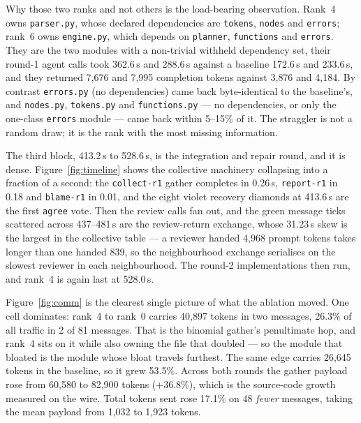 \documentclass[11pt]{article}
\begin{document}
Why those two ranks and not others is the load-bearing observation. Rank~4 owns
\texttt{parser.py}, whose declared dependencies are \texttt{tokens}, \texttt{nodes} and
\texttt{errors}; rank~6 owns \texttt{engine.py}, which depends on \texttt{planner},
\texttt{functions} and \texttt{errors}. They are the two modules with a non-trivial withheld
dependency set, their round-1 agent calls took 362.6\,s and 288.6\,s against a baseline
172.6\,s and 233.6\,s, and they returned 7{,}676 and 7{,}995 completion tokens against 3{,}876
and 4{,}184. By contrast \texttt{errors.py} (no dependencies) came back byte-identical to the
baseline's, and \texttt{nodes.py}, \texttt{tokens.py} and \texttt{functions.py} --- no
dependencies, or only the one-class \texttt{errors} module --- came back within 5--15\% of it.
The straggler is not a random draw; it is the rank with the most missing information.

The third block, 413.2\,s to 528.6\,s, is the integration and repair round, and it is dense.
Figure~\ref{fig:timeline} shows the collective machinery collapsing into a fraction of a
second: the \texttt{collect-r1} gather completes in 0.26\,s, \texttt{report-r1} in 0.18 and
\texttt{blame-r1} in 0.01, and the eight violet recovery diamonds at 413.6\,s are the first
\texttt{agree} vote. Then the review calls fan out, and the green message ticks scattered
across 437--481\,s are the review-return exchange, whose 31.23\,s skew is the largest in the
collective table --- a reviewer handed 4{,}968 prompt tokens takes longer than one handed 839,
so the neighbourhood exchange serialises on the slowest reviewer in each neighbourhood. The
round-2 implementations then run, and rank~4 is again last at 528.0\,s.

Figure~\ref{fig:comm} is the clearest single picture of what the ablation moved. One cell
dominates: rank~4 to rank~0 carries 40{,}897 tokens in two messages, 26.3\% of all traffic in
2 of 81 messages. That is the binomial gather's penultimate hop, and rank~4 sits on it while
also owning the file that doubled --- so the module that bloated is the module whose bloat
travels furthest. The same edge carries 26{,}645 tokens in the baseline, so it grew 53.5\%.
Across both rounds the gather payload rose from 60{,}580 to 82{,}900 tokens (+36.8\%), which
is the source-code growth measured on the wire. Total tokens sent rose 17.1\% on 48
\emph{fewer} messages, taking the mean payload from 1{,}032 to 1{,}923 tokens.
\end{document}

